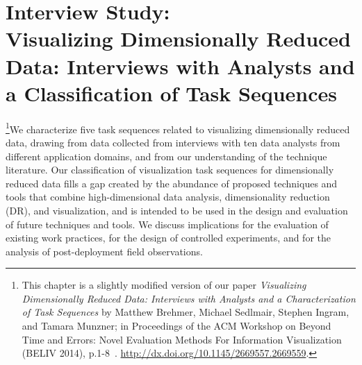 
\chapter[Interview Study\texorpdfstring{:\\ Visualizing Dimensionally Reduced Data: Interviews with Analysts and a Classification of Task Sequences}{}]{Interview Study\texorpdfstring{:\\ \large{Visualizing Dimensionally Reduced Data: Interviews with Analysts and a Classification of Task Sequences}}{}}
\label{ch:drvistasks}



\footnote{This chapter is a slightly modified version of our paper {\it Visualizing Dimensionally Reduced Data: Interviews with Analysts and a Characterization of Task Sequences} by Matthew Brehmer, Michael Sedlmair, Stephen Ingram, and Tamara Munzner; in Proceedings of the ACM Workshop on Beyond Time and Errors: Novel Evaluation Methods For Information Visualization (BELIV 2014), p.1-8~\cite{Brehmer2014b}. \url{http://dx.doi.org/10.1145/2669557.2669559}.}We characterize five task sequences related to visualizing dimensionally reduced data, drawing from data collected from interviews with ten data analysts from different application domains, and from our understanding of the technique literature.
Our classification of visualization task sequences for dimensionally reduced data fills a gap created by the abundance of proposed techniques and tools that combine high-dimensional data analysis, dimensionality reduction (DR), and visualization, and is intended to be used in the design and evaluation of future techniques and tools.
We discuss implications for the evaluation of existing work practices, for the design of controlled experiments, and for the analysis of post-deployment field observations.

